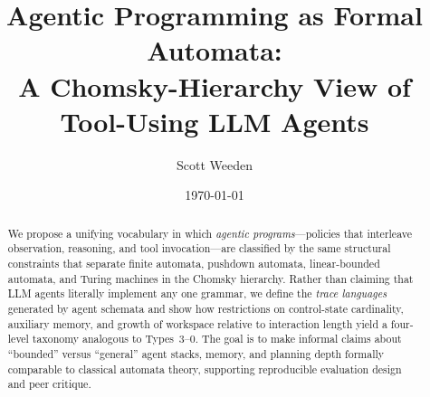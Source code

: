 \documentclass[12pt]{article}
\title{Agentic Programming as Formal Automata:\\A Chomsky-Hierarchy View of Tool-Using LLM Agents}
\author{Scott Weeden}
\date{\today}
\begin{document}
\maketitle

\begin{abstract}
We propose a unifying vocabulary in which \emph{agentic programs}---policies that interleave observation, reasoning, and tool invocation---are classified by the same structural constraints that separate finite automata, pushdown automata, linear-bounded automata, and Turing machines in the Chomsky hierarchy. Rather than claiming that LLM agents literally implement any one grammar, we define the \emph{trace languages} generated by agent schemata and show how restrictions on control-state cardinality, auxiliary memory, and growth of workspace relative to interaction length yield a four-level taxonomy analogous to Types~3--0. The goal is to make informal claims about ``bounded'' versus ``general'' agent stacks, memory, and planning depth formally comparable to classical automata theory, supporting reproducible evaluation design and peer critique.
\end{abstract}













\end{document}
